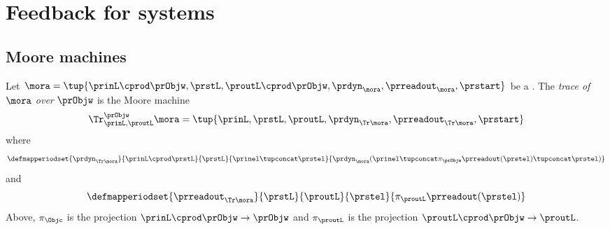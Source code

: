 
\section{Feedback for systems}
\label{sec:feedback-processes}


\subsection{Moore machines}



\begin{definition}\label{def:trace-moore}
    Let $\mora = \tup{\prinL \cprod \prObjw,\prstL,\proutL \cprod \prObjw, \prdyn_\mora,\prreadout_\mora,\prstart}$ be a .
    The \emph{trace of} $\mora$ \emph{over} $\prObjw$ is the Moore machine
    \begin{equation}
        \Tr_{\prinL,\proutL}^\prObjw \mora = \tup{\prinL,\prstL,\proutL, \prdyn_{\Tr \mora}, \prreadout_{\Tr \mora},\prstart}
    \end{equation}
    where
    \begin{equation}
        \defmapperiodset{
            \prdyn_{\Tr \mora}
        }{
            \prinL \cprod \prstL
        }{
            \prstL
        }{
            \prinel \tupconcat \prstel
        }{
            \prdyn_\mora(\prinel \tupconcat \pi_\prObjw \prreadout (\prstel) \tupconcat \prstel)
        }
    \end{equation}
    and
    \begin{equation}
        \defmapperiodset{
            \prreadout_{\Tr \mora}
        }{
            \prstL
        }{
            \proutL
        }{
            \prstel
        }{
            \pi_\proutL \prreadout (\prstel)
        }
    \end{equation}
    Above, $\pi_\Objc$ is the projection $\prinL \cprod \prObjw \to \prObjw$ and $\pi_\proutL$ is the projection $\proutL \cprod \prObjw \to \proutL$.
\end{definition}

